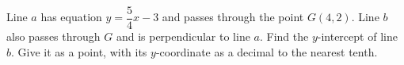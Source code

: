 Line $a$ has equation $y=\dfrac54x-3$ and passes through the point $G(4,2)$. Line $b$ also passes through $G$ and is perpendicular to line $a$. Find the $y$-intercept of line $b$. Give it as a point, with its $y$-coordinate as a decimal to the nearest tenth.
